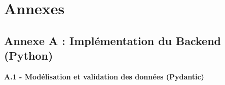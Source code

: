 \newpage
\appendix
\clearpage
{}%
\setcounter{page}{1}
\chapter*{Annexes} 
\thispagestyle{noheaderpagenum}
\pagestyle{fancy}
\renewcommand{\thesection}{\Alph{section}} %
\setcounter{section}{0} %

\section*{Annexe A : Implémentation du Backend (Python)}
\label{annexe:backend}

\setcounter{figure}{0}
\renewcommand{\thefigure}{A.\arabic{figure}}

\vspace{0.5cm}
\noindent\textbf{\LARGE A.1 - Modélisation et validation des données (Pydantic)}
\vspace{0.2cm}